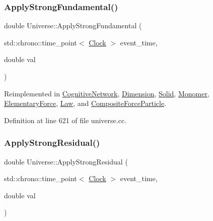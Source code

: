 \mbox{\label{class_universe_a62789bcff84bd750b0366004381e2fdd}} 
\subsubsection{\texorpdfstring{Apply\+Strong\+Fundamental()}{ApplyStrongFundamental()}}
{\footnotesize\ttfamily double Universe\+::\+Apply\+Strong\+Fundamental (\begin{DoxyParamCaption}\item[{std\+::chrono\+::time\+\_\+point$<$ \mbox{\hyperlink{universe_8h_a0ef8d951d1ca5ab3cfaf7ab4c7a6fd80}{Clock}} $>$}]{event\+\_\+time,  }\item[{double}]{val }\end{DoxyParamCaption})\hspace{0.3cm}{\ttfamily [virtual]}}



Reimplemented in \mbox{\hyperlink{class_cognitive_network_af25bbd4f4d8f370cd2a48fd6db8302b9}{Cognitive\+Network}}, \mbox{\hyperlink{class_dimension_afb01fb9e469da18899d4b14e5f095ece}{Dimension}}, \mbox{\hyperlink{class_solid_abd8fff76385306f97aa65dfd6b867fc6}{Solid}}, \mbox{\hyperlink{class_monomer_aa186454670f7796e196509238d419a35}{Monomer}}, \mbox{\hyperlink{class_elementary_force_a80f1977e777aa0c8cce2124b666e6446}{Elementary\+Force}}, \mbox{\hyperlink{class_law_a57d05f26e1c0ee953260ebd3780248f8}{Law}}, and \mbox{\hyperlink{class_composite_force_particle_a64fe19ee12d6ca0a69f650faa5bedb58}{Composite\+Force\+Particle}}.



Definition at line 621 of file universe.\+cc.

\mbox{\label{class_universe_af7becebb347be9a85541d96a3eca1ca7}} 
\subsubsection{\texorpdfstring{Apply\+Strong\+Residual()}{ApplyStrongResidual()}}
{\footnotesize\ttfamily double Universe\+::\+Apply\+Strong\+Residual (\begin{DoxyParamCaption}\item[{std\+::chrono\+::time\+\_\+point$<$ \mbox{\hyperlink{universe_8h_a0ef8d951d1ca5ab3cfaf7ab4c7a6fd80}{Clock}} $>$}]{event\+\_\+time,  }\item[{double}]{val }\end{DoxyParamCaption})\hspace{0.3cm}{\ttfamily [virtual]}}



